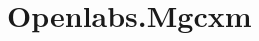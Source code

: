 \chapter{Openlabs.\+Mgcxm}
\hypertarget{md__r_e_a_d_m_e}{}\label{md__r_e_a_d_m_e}
\label{md__r_e_a_d_m_e_autotoc_md12}%
%
